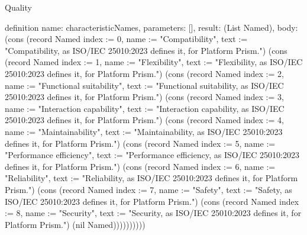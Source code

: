 \begin{lexlean}{Quality}
\begin{semanticmodule}
definition{
  name: characteristicNames,
  parameters: [],
  result: (List Named),
  body: (cons (record Named {index := 0, name := "Compatibility", text := "Compatibility, as ISO/IEC 25010:2023 defines it, for Platform Prism."}) (cons (record Named {index := 1, name := "Flexibility", text := "Flexibility, as ISO/IEC 25010:2023 defines it, for Platform Prism."}) (cons (record Named {index := 2, name := "Functional suitability", text := "Functional suitability, as ISO/IEC 25010:2023 defines it, for Platform Prism."}) (cons (record Named {index := 3, name := "Interaction capability", text := "Interaction capability, as ISO/IEC 25010:2023 defines it, for Platform Prism."}) (cons (record Named {index := 4, name := "Maintainability", text := "Maintainability, as ISO/IEC 25010:2023 defines it, for Platform Prism."}) (cons (record Named {index := 5, name := "Performance efficiency", text := "Performance efficiency, as ISO/IEC 25010:2023 defines it, for Platform Prism."}) (cons (record Named {index := 6, name := "Reliability", text := "Reliability, as ISO/IEC 25010:2023 defines it, for Platform Prism."}) (cons (record Named {index := 7, name := "Safety", text := "Safety, as ISO/IEC 25010:2023 defines it, for Platform Prism."}) (cons (record Named {index := 8, name := "Security", text := "Security, as ISO/IEC 25010:2023 defines it, for Platform Prism."}) (nil Named))))))))))
}


\end{semanticmodule}
\end{lexlean}
